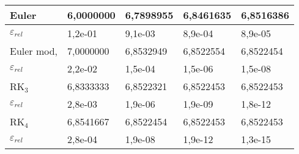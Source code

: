 \begin{resp}
\begin{center}
 \begin{tabular}{|l|l|l|l|l|}%
\hline
Euler & 6,0000000 & 6,7898955 & 6,8461635 & 6,8516386\\
\hline
$\varepsilon_{rel}$ & 1,2e-01 & 9,1e-03 & 8,9e-04 & 8,9e-05\\
\hline
Euler mod, & 7,0000000 & 6,8532949 & 6,8522554 & 6,8522454\\
\hline
$\varepsilon_{rel}$ & 2,2e-02 & 1,5e-04 & 1,5e-06 & 1,5e-08\\
\hline
RK$_3$ & 6,8333333 & 6,8522321 & 6,8522453 & 6,8522453\\
\hline
$\varepsilon_{rel}$ & 2,8e-03 & 1,9e-06 & 1,9e-09 & 1,8e-12\\
\hline
RK$_4$ & 6,8541667 & 6,8522454 & 6,8522453 & 6,8522453\\
\hline
$\varepsilon_{rel}$ & 2,8e-04 & 1,9e-08 & 1,9e-12 & 1,3e-15\\
\hline
\end{tabular}
\end{center}

\end{resp}



